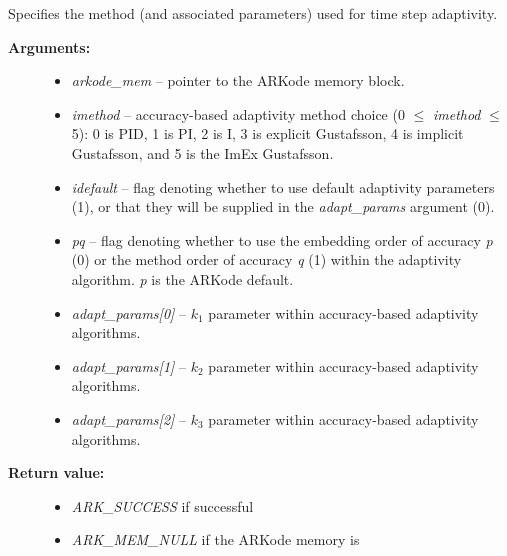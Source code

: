 \documentclass[letterpaper,10pt,english]{sphinxmanual}
\begin{document}
\begin{fulllineitems}
\label{c_interface/User_callable:ARKodeSetAdaptivityMethod}
Specifies the method (and associated parameters) used for time step adaptivity.
\begin{description}
\item[{\textbf{Arguments:}}] \leavevmode\begin{itemize}
\item {} 
\emph{arkode\_mem} -- pointer to the ARKode memory block.

\item {} 
\emph{imethod} -- accuracy-based adaptivity method choice
(0 $\le$ \emph{imethod} $\le$ 5):
0 is PID, 1 is PI, 2 is I, 3 is explicit Gustafsson, 4 is
implicit Gustafsson, and 5 is the ImEx Gustafsson.

\item {} 
\emph{idefault} -- flag denoting whether to use default adaptivity
parameters (1), or that they will be supplied in the
\emph{adapt\_params} argument (0).

\item {} 
\emph{pq} -- flag denoting whether to use the embedding order of
accuracy \emph{p} (0) or the method order of accuracy \emph{q} (1)
within the adaptivity algorithm.  \emph{p} is the ARKode default.

\item {} 
\emph{adapt\_params{[}0{]}} -- $k_1$ parameter within accuracy-based adaptivity algorithms.

\item {} 
\emph{adapt\_params{[}1{]}} -- $k_2$ parameter within accuracy-based adaptivity algorithms.

\item {} 
\emph{adapt\_params{[}2{]}} -- $k_3$ parameter within accuracy-based adaptivity algorithms.

\end{itemize}

\item[{\textbf{Return value:}}] \leavevmode\begin{itemize}
\item {} 
\emph{ARK\_SUCCESS} if successful

\item {} 
\emph{ARK\_MEM\_NULL} if the ARKode memory is 


\end{itemize}
\end{description}
\end{fulllineitems}
\end{document}

